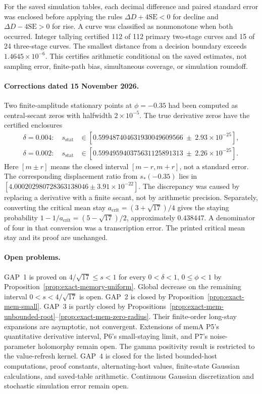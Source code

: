 For the saved simulation tables, each decimal difference and paired standard error was enclosed before applying the rules \(\Delta D+4\mathrm{SE}<0\) for decline and \(\Delta D-4\mathrm{SE}>0\) for rise. A curve was classified as nonmonotone when both occurred. Integer tallying certified 112 of 112 primary two-stage curves and 15 of 24 three-stage curves. The smallest distance from a decision boundary exceeds \(1.4645\times10^{-6}\). This certifies arithmetic conditional on the saved estimates, not sampling error, finite-path bias, simultaneous coverage, or simulation roundoff.

\paragraph{Corrections dated 15 November 2026.}
Two finite-amplitude stationary points at \(\phi=-0.35\) had been computed as central-secant zeros with halfwidth \(2\times10^{-5}\). The true derivative zeros have the certified enclosures
\begin{equation}\label{eq:exact-cert-corrections}
 \begin{aligned}
 \delta=0.004:\quad s_{\mathrm{stat}}&\in[0.599487404631930049609566\ \pm\ 2.93\times10^{-25}],\\
 \delta=0.002:\quad s_{\mathrm{stat}}&\in[0.599495940375631125891313\ \pm\ 2.26\times10^{-25}].
 \end{aligned}
\end{equation}
Here \([m\pm r]\) means the closed interval \([m-r,m+r]\), not a standard error. The corresponding displacement ratio from \(s_*(-0.35)\) lies in \([4.000202980728363138046\pm3.91\times10^{-22}]\). The discrepancy was caused by replacing a derivative with a finite secant, not by arithmetic precision. Separately, converting the critical mean stay \(a_{\mathrm{crit}}=(3+\sqrt{17})/4\) gives the staying probability \(1-1/a_{\mathrm{crit}}=(5-\sqrt{17})/2\), approximately \(0.438447\). A denominator of four in that conversion was a transcription error. The printed critical mean stay and its proof are unchanged.

\paragraph{Open problems.}
GAP~1 is proved on \(4/\sqrt{17}\leq s<1\) for every \(0<\delta<1\), \(0\leq\phi<1\) by Proposition~\ref{prop:exact-memory-uniform}. Global decrease on the remaining interval \(0<s<4/\sqrt{17}\) is open. GAP~2 is closed by Proposition~\ref{prop:exact-mem-small}. GAP~3 is partly closed by Propositions~\ref{prop:exact-mem-unbounded-root}--\ref{prop:exact-mem-zero-radius}. Their finite-order long-stay expansions are asymptotic, not convergent. Extensions of memA P5's quantitative derivative interval, P6's small-staying limit, and P7's noise-parameter holomorphy remain open. The gamma positivity result is restricted to the value-refresh kernel. GAP~4 is closed for the listed bounded-host computations, proof constants, alternating-host values, finite-state Gaussian calculations, and saved-table arithmetic. Continuous Gaussian discretization and stochastic simulation error remain open.
